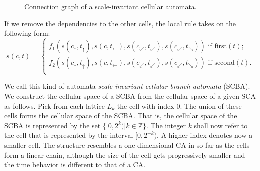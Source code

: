 \documentclass[pre,amssymb,showpacs,showkeys,preprint]{revtex4}
\begin{document}
\begin{figure}
\begin{center}
\caption{\label{fig:linear-sub-ca} Connection graph of a scale-invariant cellular automata.}
\end{center}
\end{figure}

If we remove the dependencies to the other cells, the local rule takes on the following form:
\[
s(c,t) = \left\{
\begin{array}{l}
f_{1}(
	s(c_\uparrow, t_\uparrow),
	s(c, t_\leftarrow),
	s(c_\swarrow, t_\swarrow),
	s(c_\swarrow, t_\searrow)
) \mbox{  if first$(t)$;} \\
f_{2}(
	s(c_\uparrow, t_\uparrow),
	s(c, t_\leftarrow),
	s(c_\swarrow, t_\swarrow),
	s(c_\swarrow, t_\searrow)
) \mbox{  if second$(t)$.} \\
\end{array}
\right.
\]

We call this kind of automata \emph{scale-invariant cellular branch automata} (SCBA).
We construct the cellular space of a SCBA from the cellular space of a given SCA as follows.
Pick from each lattice $L_k$ the cell with index 0.
The union of these cells forms the cellular space of the SCBA.
That is, the cellular space of the SCBA is represented by the set $\{[0,2^k) | k \in \mathbb Z\}$.
The integer $k$ shall now refer to the cell that is represented by the interval $[0,2^{-k})$.
A higher index denotes now a smaller cell.
The structure resembles a one-dimensional CA in so far as the cells form a linear chain, although the
size of the cell gets progressively smaller and the time behavior is different to that of a CA.
\end{document}
